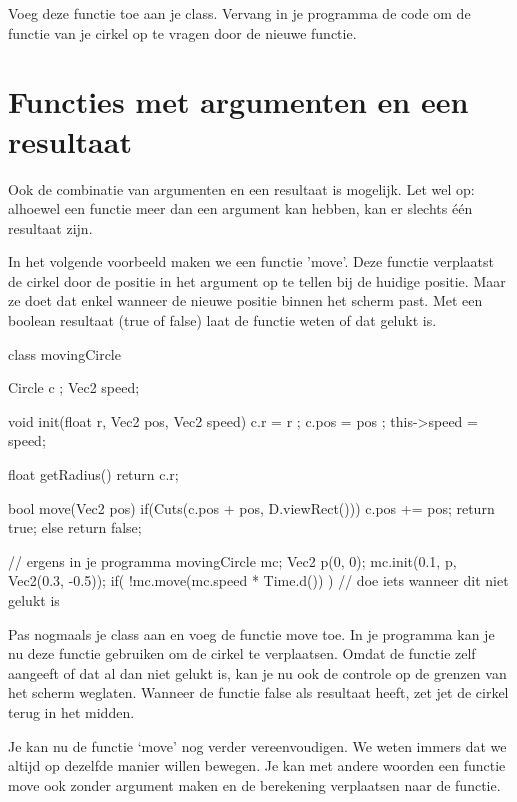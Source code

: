 \begin{exercise}
Voeg deze functie toe aan je class. Vervang in je programma de code om de functie van je cirkel op te vragen door de nieuwe functie.
\end{exercise}

\section{Functies met argumenten en een resultaat}
Ook de combinatie van argumenten en een resultaat is mogelijk. Let wel op: alhoewel een functie meer dan een argument kan hebben, kan er slechts \'e\'en resultaat zijn.

In het volgende voorbeeld maken we een functie 'move'. Deze functie verplaatst de cirkel door de positie in het argument op te tellen bij de huidige positie. Maar ze doet dat enkel wanneer de nieuwe positie binnen het scherm past. Met een boolean resultaat (true of false) laat de functie weten of dat gelukt is.

\begin{code}
class movingCircle {
  Circle c    ;
  Vec2   speed;
  
  void init(float r, Vec2 pos, Vec2 speed) {
    c.r         = r    ;
    c.pos       = pos  ;
    this->speed = speed;
  }
  
  float getRadius() {
    return c.r;
  }
  
  bool move(Vec2 pos) {
    if(Cuts(c.pos + pos, D.viewRect())) {
      c.pos += pos;
      return true;
    } else {
      return false;
    }
  }
}

// ergens in je programma
movingCircle mc;
Vec2 p(0, 0);
mc.init(0.1, p, Vec2(0.3, -0.5));
if( !mc.move(mc.speed * Time.d()) ) {
  // doe iets wanneer dit niet gelukt is
}
\end{code}

\begin{exercise}
Pas nogmaals je class aan en voeg de functie move toe. In je programma kan je nu deze functie gebruiken om de cirkel te verplaatsen. Omdat de functie zelf aangeeft of dat al dan niet gelukt is, kan je nu ook de controle op de grenzen van het scherm weglaten. Wanneer de functie false als resultaat heeft, zet jet de cirkel terug in het midden.

Je kan nu de functie `move' nog verder vereenvoudigen. We weten immers dat we altijd op dezelfde manier willen bewegen. Je kan met andere woorden een functie move ook zonder argument maken en de berekening verplaatsen naar de functie.
\end{exercise}

